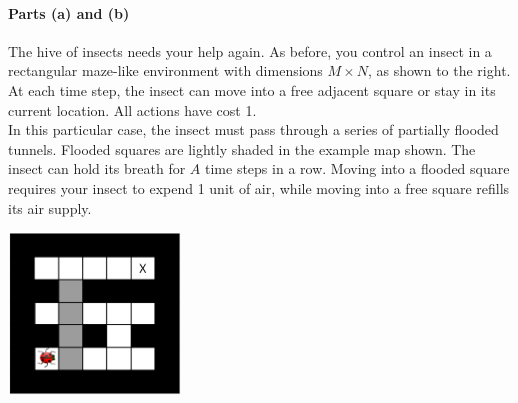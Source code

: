 

\begin{minipage}{0.65\linewidth}
\paragraph{Parts (a) and (b)} The hive of insects needs your help again. As before, you control an insect in a rectangular maze-like environment with dimensions $M \times N$, as shown to the right. At each time step, the insect can move into a free adjacent square or stay in its current location.  All actions have cost 1.
\\

In this particular case, the insect must pass through a series of partially flooded tunnels.  Flooded squares are lightly shaded in the example map shown.  The insect can hold its breath for $A$ time steps in a row.  Moving into a flooded square requires your insect to expend 1 unit of air, while moving into a free square refills its air supply.
\end{minipage}
\begin{minipage}{0.35\linewidth}
\begin{center}
\includegraphics[width=1.8in]{figs/search}
\end{center}
\end{minipage}

